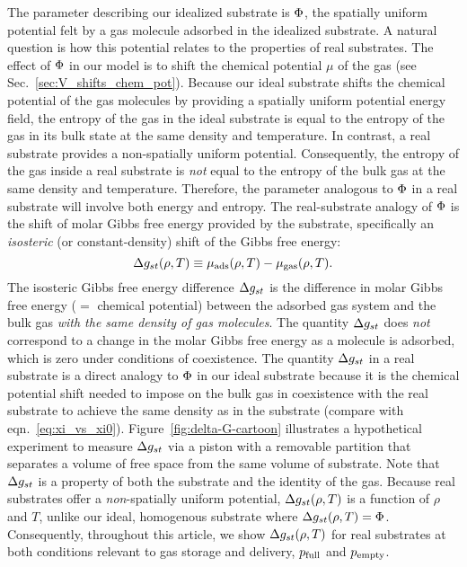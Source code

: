 The parameter describing our idealized substrate is $\Phi$, the spatially uniform potential felt by a gas molecule adsorbed in the idealized substrate. 
A natural question is how this potential relates to the properties of real substrates. 
The effect of $\Phi$ in our model is to shift the chemical potential $\mu$ of the gas (see Sec.~\ref{sec:V_shifts_chem_pot}).
Because our ideal substrate shifts the chemical potential of the gas molecules by providing a spatially uniform potential energy field, the entropy of the gas in the ideal substrate is equal to the entropy of the gas in its bulk state at the same density and temperature.
In contrast, a real substrate provides a non-spatially uniform potential. Consequently, the entropy of the gas inside a real substrate is \emph{not} equal to the entropy of the bulk gas at the same density and temperature. 
Therefore, the parameter analogous to $\Phi$ in a real substrate will involve both energy and entropy.
The real-substrate analogy of $\Phi$ is the shift of molar Gibbs free energy provided by the substrate, specifically an \emph{isosteric} (or constant-density) shift of the Gibbs free energy:
\begin{equation}
   \Delta g_{st}(\rho, T) \equiv
    \mu_{\text{ads}}(\rho, T) - \mu_{\text{gas}}(\rho, T).
  \label{eq:g_st}
\end{equation}
The isosteric Gibbs free energy difference $\Delta g_{st}$ is the difference in molar Gibbs free energy ($=$ chemical potential) between the adsorbed gas system and the bulk gas \emph{with the same density of gas molecules}. The quantity $\Delta g_{st}$ does \emph{not} correspond to a change in the molar Gibbs free energy as a molecule is adsorbed, which is zero under conditions of coexistence. 
The quantity $\Delta g_{st}$ in a real substrate is a direct analogy to $\Phi$ in our ideal substrate because it is the chemical potential shift needed to impose on the bulk gas in coexistence with the real substrate to achieve the same density as in the substrate (compare with eqn.~\ref{eq:xi_vs_xi0}).
Figure~\ref{fig:delta-G-cartoon} illustrates a hypothetical experiment to  measure $\Delta g_{st}$ via a piston with a removable partition that separates a volume of free space from the same volume of substrate. Note that $\Delta g_{st}$ is a property of both the substrate and the identity of the gas. Because real substrates offer a \emph{non}-spatially uniform potential, $\Delta g_{st}(\rho, T)$ is a function of $\rho$ and $T$, unlike our ideal, homogenous substrate where $\Delta g_{st}(\rho, T)=\Phi$. Consequently, throughout this article, we show $\Delta g_{st}(\rho, T)$ for real substrates at both conditions relevant to gas storage and delivery, $p_{\text{full}}$ and $p_{\text{empty}}$. 
